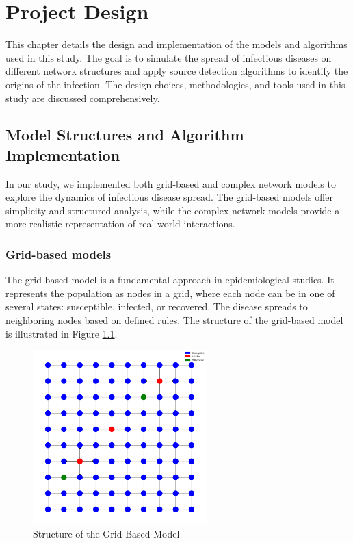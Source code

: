 \chapter{Project Design}

This chapter details the design and implementation of the models and algorithms used in this study. The goal is to simulate the spread of infectious diseases on different network structures and apply source detection algorithms to identify the origins of the infection. The design choices, methodologies, and tools used in this study are discussed comprehensively.

\section{Model Structures and Algorithm Implementation}

In our study, we implemented both grid-based and complex network models to explore the dynamics of infectious disease spread. The grid-based models offer simplicity and structured analysis, while the complex network models provide a more realistic representation of real-world interactions.

\subsection{Grid-based models}

The grid-based model is a fundamental approach in epidemiological studies. It represents the population as nodes in a grid, where each node can be in one of several states: susceptible, infected, or recovered. The disease spreads to neighboring nodes based on defined rules. The structure of the grid-based model is illustrated in Figure \ref{fig:grid_model_structure}.

\begin{figure}[H]
    \centering
    \includegraphics[width=0.6\textwidth]{grid_model_structure.png}
    \caption{Structure of the Grid-Based Model}
    \label{fig:grid_model_structure}
\end{figure}


